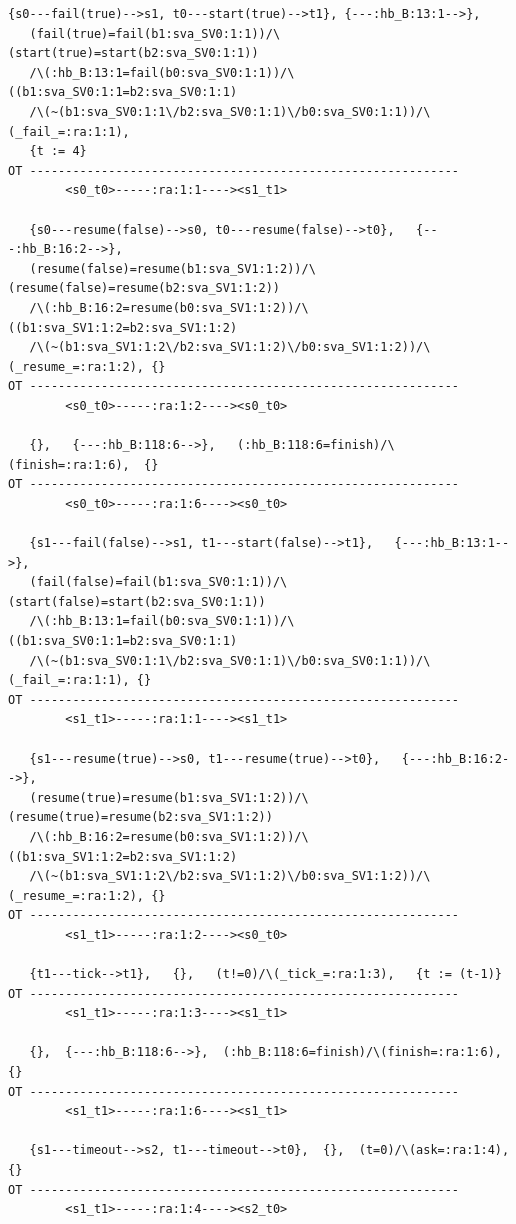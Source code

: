 \documentclass{lncs/llncs}
\begin{document}
\begin{lstlisting}[basicstyle=\scriptsize\ttfamily, frame=single]
   {s0---fail(true)-->s1, t0---start(true)-->t1}, {---:hb_B:13:1-->},
   (fail(true)=fail(b1:sva_SV0:1:1))/\(start(true)=start(b2:sva_SV0:1:1))
   /\(:hb_B:13:1=fail(b0:sva_SV0:1:1))/\((b1:sva_SV0:1:1=b2:sva_SV0:1:1)
   /\(~(b1:sva_SV0:1:1\/b2:sva_SV0:1:1)\/b0:sva_SV0:1:1))/\(_fail_=:ra:1:1),
   {t := 4}
OT ------------------------------------------------------------
        <s0_t0>-----:ra:1:1----><s1_t1>

   {s0---resume(false)-->s0, t0---resume(false)-->t0},   {---:hb_B:16:2-->},
   (resume(false)=resume(b1:sva_SV1:1:2))/\(resume(false)=resume(b2:sva_SV1:1:2))
   /\(:hb_B:16:2=resume(b0:sva_SV1:1:2))/\((b1:sva_SV1:1:2=b2:sva_SV1:1:2)
   /\(~(b1:sva_SV1:1:2\/b2:sva_SV1:1:2)\/b0:sva_SV1:1:2))/\(_resume_=:ra:1:2), {}
OT ------------------------------------------------------------
        <s0_t0>-----:ra:1:2----><s0_t0>

   {},   {---:hb_B:118:6-->},   (:hb_B:118:6=finish)/\(finish=:ra:1:6),  {}
OT ------------------------------------------------------------
        <s0_t0>-----:ra:1:6----><s0_t0>

   {s1---fail(false)-->s1, t1---start(false)-->t1},   {---:hb_B:13:1-->},
   (fail(false)=fail(b1:sva_SV0:1:1))/\(start(false)=start(b2:sva_SV0:1:1))
   /\(:hb_B:13:1=fail(b0:sva_SV0:1:1))/\((b1:sva_SV0:1:1=b2:sva_SV0:1:1)
   /\(~(b1:sva_SV0:1:1\/b2:sva_SV0:1:1)\/b0:sva_SV0:1:1))/\(_fail_=:ra:1:1), {}
OT ------------------------------------------------------------
        <s1_t1>-----:ra:1:1----><s1_t1>

   {s1---resume(true)-->s0, t1---resume(true)-->t0},   {---:hb_B:16:2-->},
   (resume(true)=resume(b1:sva_SV1:1:2))/\(resume(true)=resume(b2:sva_SV1:1:2))
   /\(:hb_B:16:2=resume(b0:sva_SV1:1:2))/\((b1:sva_SV1:1:2=b2:sva_SV1:1:2)
   /\(~(b1:sva_SV1:1:2\/b2:sva_SV1:1:2)\/b0:sva_SV1:1:2))/\(_resume_=:ra:1:2), {}
OT ------------------------------------------------------------
        <s1_t1>-----:ra:1:2----><s0_t0>

   {t1---tick-->t1},   {},   (t!=0)/\(_tick_=:ra:1:3),   {t := (t-1)}
OT ------------------------------------------------------------
        <s1_t1>-----:ra:1:3----><s1_t1>

   {},  {---:hb_B:118:6-->},  (:hb_B:118:6=finish)/\(finish=:ra:1:6),  {}
OT ------------------------------------------------------------
        <s1_t1>-----:ra:1:6----><s1_t1>

   {s1---timeout-->s2, t1---timeout-->t0},  {},  (t=0)/\(ask=:ra:1:4),  {}
OT ------------------------------------------------------------
        <s1_t1>-----:ra:1:4----><s2_t0>


\end{lstlisting}
\end{document}
